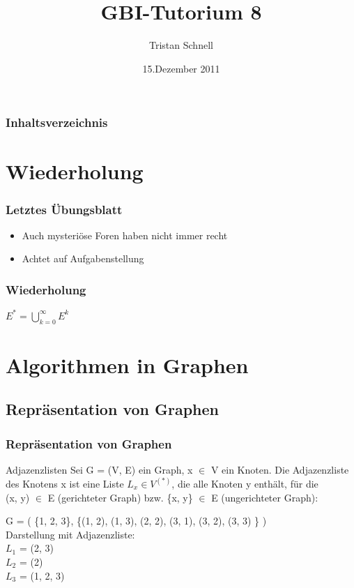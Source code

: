 \documentclass{beamer}
\author{Tristan Schnell}
\title{GBI-Tutorium 8}
\date{15.Dezember 2011}
\begin{document}
\begin {frame}
	\titlepage
\end {frame}

\begin {frame}
	\frametitle {Inhaltsverzeichnis}
	\tableofcontents
\end {frame}

\section{Wiederholung}

\begin{frame}
	\frametitle{Letztes \"Ubungsblatt}
		\begin{itemize}
			\item Auch mysteriöse Foren haben nicht immer recht
			\item Achtet auf Aufgabenstellung
		\end{itemize}
\end{frame}

\begin{frame}
	\frametitle{Wiederholung}
	\begin{center}
		$E^* = \bigcup_{k = 0}^\infty E^k$
	\end{center}
\end{frame}

\section{Algorithmen in Graphen} 
\subsection{Repr\"asentation von Graphen}

\begin{frame}
	\frametitle{Repr\"asentation von Graphen}

	\begin{block}{Adjazenzlisten}
		Sei G = (V, E) ein Graph, x $\in$ V ein Knoten. Die Adjazenzliste des Knotens x ist eine Liste $L_x \in V^{(*)}$, die alle 				Knoten y enth\"alt, f\"ur die \\ (x, y) $\in$ E (gerichteter Graph) bzw. \{x, y\} $\in$ E (ungerichteter Graph):
	\end{block}

	\begin{example}
		G = ( \{1, 2, 3\}, \{(1, 2), (1, 3), (2, 2), (3, 1), (3, 2), (3, 3) \} ) \\
		\parskip 12pt
		Darstellung mit Adjazenzliste: \\
		$L_1$ = (2, 3) \\
		$L_2$ = (2) \\
		$L_3$ = (1, 2, 3)\\
		
	\end{example}
\end{frame}
\end{document}
